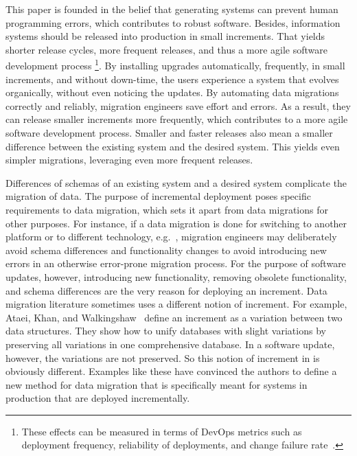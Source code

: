 \documentclass{elsarticle}
\begin{document}
   This paper is founded in the belief that generating systems can prevent human programming errors, which contributes to robust software.
   Besides, information systems should be released into production in small increments.
   That yields shorter release cycles, more frequent releases, and thus a more agile software development process%
   \footnote{These effects can be measured in terms of DevOps metrics such as
   deployment frequency,
   reliability of deployments, and
   change failure rate~\cite{DevOps2021}.}.
   By installing upgrades automatically, frequently, in small increments, and without down-time,
   the users experience a system that evolves organically, without even noticing the updates.
   By automating data migrations correctly and reliably, migration engineers save effort and errors.
   As a result, they can release smaller increments more frequently, which contributes to a more agile software development process.
   Smaller and faster releases also mean a smaller difference between the existing system and the desired system.
   This yields even simpler migrations, leveraging even more frequent releases.
   
   Differences of schemas of an existing system and a desired system complicate the migration of data.
   The purpose of incremental deployment poses specific requirements to data migration,
   which sets it apart from data migrations for other purposes.
   For instance, if a data migration is done for switching to another platform or to different technology,
   e.g.~\cite{Gholami2016,Bisbal1999},
   migration engineers may deliberately avoid schema differences and functionality changes to avoid introducing new errors in an otherwise error-prone migration process.
   For the purpose of software updates, however, introducing new functionality, removing obsolete functionality, and schema differences are the very reason for deploying an increment.
   Data migration literature sometimes uses a different notion of increment.
   For example, Ataei, Khan, and Walkingshaw~\cite{Ataei2021,Walkingshaw2014} define an increment as a variation between two data structures.
   They show how to unify databases with slight variations by preserving all variations in one comprehensive database.
   In a software update, however, the variations are not preserved.
   So this notion of increment in\cite{Ataei2021} is obviously different.
   Examples like these have convinced the authors to define a new method for data migration that is specifically meant for systems in production that are
   deployed incrementally.
   
\end{document}
